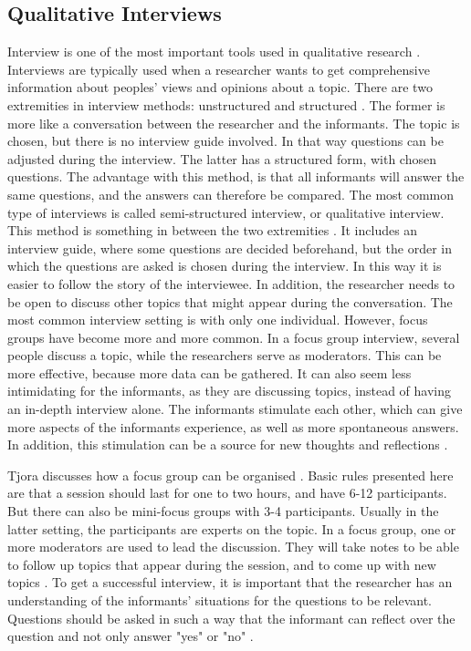 \subsection{Qualitative Interviews}
\label{sec:qualitativeInterviews}
Interview is one of the most important tools used in qualitative research \cite{interview}. Interviews are typically used when a researcher wants to get comprehensive information about peoples' views and opinions about a topic. There are two extremities in interview methods: unstructured and structured \cite{qualitative}. The former is more like a conversation between the researcher and the informants. The topic is chosen, but there is no interview guide involved. In that way questions can be adjusted during the interview. The latter has a structured form, with chosen questions. The advantage with this method, is that all informants will answer the same questions, and the answers can therefore be compared. The most common type of interviews is called semi-structured interview, or qualitative interview. This method is something in between the two extremities \cite{qualitative}. It includes an interview guide, where some questions are decided beforehand, but the order in which the questions are asked is chosen during the interview. In this way it is easier to follow the story of the interviewee. In addition, the researcher needs to be open to discuss other topics that might appear during the conversation. The most common interview setting is with only one individual. However, focus groups have become more and more common. In a focus group interview, several people discuss a topic, while the researchers serve as moderators. This can be more effective, because more data can be gathered. It can also seem less intimidating for the informants, as they are discussing topics, instead of having an in-depth interview alone. The informants stimulate each other, which can give more aspects of the informants experience, as well as more spontaneous answers. In addition, this stimulation can be a source for new thoughts and reflections \cite{tjora}. 

Tjora discusses how a focus group can be organised \cite{tjora}. Basic rules presented here are that a session should last for one to two hours, and have 6-12 participants. But there can also be mini-focus groups with 3-4 participants. Usually in the latter setting, the participants are experts on the topic. In a focus group, one or more moderators are used to lead the discussion. They will take notes to be able to follow up topics that appear during the session, and to come up with new topics \cite{tjora}. To get a successful interview, it is important that the researcher has an understanding of the informants' situations for the questions to be relevant. Questions should be asked in such a way that the informant can reflect over the question and not only answer "yes" or "no" \cite{qualitative}.

